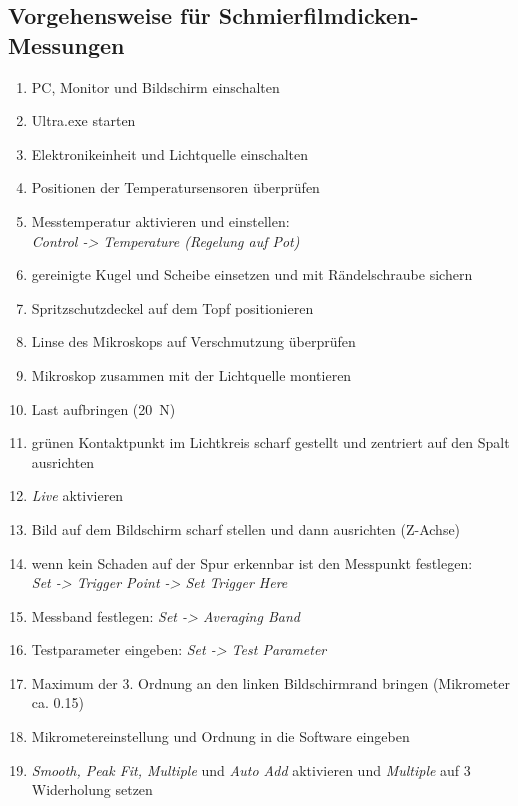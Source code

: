 \begin{appendices}
    \section{Vorgehensweise für Schmierfilmdicken-Messungen \cite{surborg_2007}}
        \begin{enumerate}
            \item PC, Monitor und Bildschirm einschalten
            \item Ultra.exe starten
            \item Elektronikeinheit und Lichtquelle einschalten
            \item Positionen der Temperatursensoren überprüfen
            \item Messtemperatur aktivieren und einstellen: \\
                \textit{Control -> Temperature (Regelung auf Pot)}
            \item gereinigte Kugel und Scheibe einsetzen und mit Rändelschraube sichern
            \item Spritzschutzdeckel auf dem Topf positionieren
            \item Linse des Mikroskops auf Verschmutzung überprüfen
            \item Mikroskop zusammen mit der Lichtquelle montieren
            \item Last aufbringen (\SI{20}{\newton})
            \item grünen Kontaktpunkt im Lichtkreis scharf gestellt und zentriert auf den Spalt ausrichten
            \item \textit{Live} aktivieren
            \item Bild auf dem Bildschirm scharf stellen und dann ausrichten (Z-Achse)
            \item wenn kein Schaden auf der Spur erkennbar ist den Messpunkt festlegen: \\
                \textit{Set -> Trigger Point -> Set Trigger Here}
            \item Messband festlegen: \textit{Set -> Averaging Band}
            \item Testparameter eingeben: \textit{Set -> Test Parameter}
            \item Maximum der 3. Ordnung an den linken Bildschirmrand bringen (Mikrometer ca. \num{0.15})
            \item Mikrometereinstellung und Ordnung in die Software eingeben
            \item \textit{Smooth, Peak Fit, Multiple} und \textit{Auto Add} aktivieren und \textit{Multiple} auf \num{3} Widerholung setzen

\end{enumerate}
\end{appendices}
